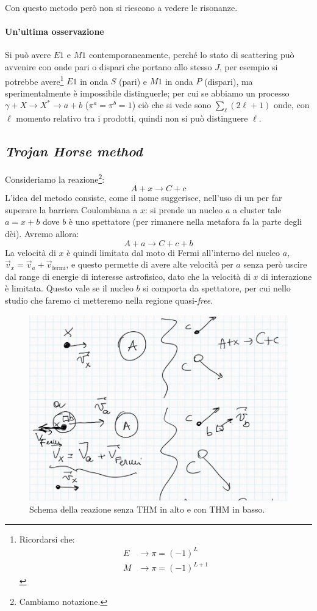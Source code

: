 \noindent Con questo metodo però non si riescono a vedere le risonanze.

\paragraph{Un'ultima osservazione} Si può avere $E1$ e $M1$ contemporaneamente, perché lo stato di scattering può avvenire con onde pari o dispari che portano allo stesso $J$, per esempio si potrebbe avere\footnote{Ricordarsi che:%
\begin{align*}
	E&\to\pi=(-1)^L \\
	M&\to\pi=(-1)^{L+1} 
\end{align*}%
} $E1$ in onda $S$ (pari) e $M1$ in onda $P$ (dispari), ma sperimentalmente è impossibile distinguerle; per cui se abbiamo un processo $\gamma + X \to X^* \to a+b$ ($\pi^a=\pi^b=1$) ciò che si vede sono $\sum_\ell (2\ell+1)$ onde, con $\ell$ momento relativo tra i prodotti, quindi non si può distinguere $\ell$.
\newpage
\subsection{\textit{Trojan Horse method}}
Consideriamo la reazione\footnote{Cambiamo notazione.}:
$$A+x \to C+c$$
L'idea del metodo consiste, come il nome suggerisce, nell'uso di un  per far superare la barriera Coulombiana a $x$: si prende un nucleo $a$ a cluster tale $a=x+b$ dove $b$ è uno spettatore (per rimanere nella metafora fa la parte degli dèi). Avremo allora:
$$A+a \to C+c + b$$
La velocità di $x$ è quindi limitata dal moto di Fermi all'interno del nucleo $a$, $\vec{v}_x = \vec{v}_a + \vec{v}_\text{fermi}$, e questo permette di avere alte velocità per $a$ senza però uscire dal range di energie di interesse astrofisico, dato che la velocità di $x$ di interazione è limitata. Questo vale se il nucleo $b$ si comporta da spettatore, per cui nello studio che faremo ci metteremo nella regione quasi-\textit{free}.

\begin{figure}[ht]
	\centering
	\includegraphics[scale=0.5]{Immagini/0419_scontro.png}
	\caption{Schema della reazione senza THM in alto e con THM in basso.}
	\label{0419_scontro}
\end{figure}

